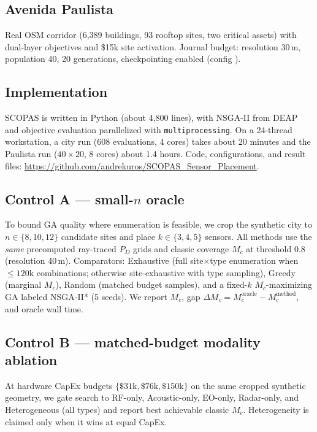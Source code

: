 \subsection{Avenida Paulista}

Real OSM corridor (6,389 buildings, 93 rooftop sites, two critical assets) with dual-layer objectives and \$15k site activation. Journal budget: resolution 30\,m, population 40, 20 generations, checkpointing enabled (config ).

\subsection{Implementation}

SCOPAS is written in Python (about 4,800 lines), with NSGA-II from DEAP \cite{deap2012} and objective evaluation parallelized with \texttt{multiprocessing}. On a 24-thread workstation, a city run (608 evaluations, 4 cores) takes about 20 minutes and the Paulista run (\(40\times20\), 8 cores) about 1.4 hours. Code, configurations, and result files: \url{https://github.com/andrekuros/SCOPAS_Sensor_Placement}.

\subsection{Control A --- small-$n$ oracle}
\label{sec:protocol_oracle}

To bound GA quality where enumeration is feasible, we crop the synthetic city to \(n\in\{8,10,12\}\) candidate sites and place \(k\in\{3,4,5\}\) sensors. All methods use the \emph{same} precomputed ray-traced \(P_D\) grids and classic coverage \(M_c\) at threshold \(0.8\) (resolution 40\,m). Comparators: Exhaustive (full site$\times$type enumeration when \(\leq120\)k combinations; otherwise site-exhaustive with type sampling), Greedy (marginal \(M_c\)), Random (matched budget samples), and a fixed-$k$ \(M_c\)-maximizing GA labeled NSGA-II* (5 seeds). We report \(M_c\), gap \(\Delta M_c = M_c^{\mathrm{oracle}}-M_c^{\mathrm{method}}\), and oracle wall time.

\subsection{Control B --- matched-budget modality ablation}
\label{sec:protocol_ablation}

At hardware CapEx budgets \(\{\$31\mathrm{k},\$76\mathrm{k},\$150\mathrm{k}\}\) on the same cropped synthetic geometry, we gate search to RF-only, Acoustic-only, EO-only, Radar-only, and Heterogeneous (all types) and report best achievable classic \(M_c\). Heterogeneity is claimed only when it wins at equal CapEx.

